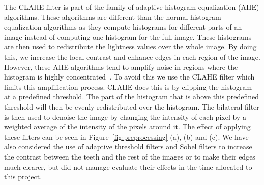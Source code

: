 \documentclass[a4paper]{article}
\begin{document}
The CLAHE filter is part of the family of adaptive histogram equalization (AHE) algorithms.
These algorithms are different than the normal histogram equalization algorithms as they compute histograms for different parts of an image instead of computing one histogram for the full image.
These histograms are then used to redistribute the lightness values over the whole image.
By doing this, we increase the local contrast and enhance edges in each region of the image.
However, these AHE algorithms tend to amplify noise in regions where the histogram is highly concentrated~\cite{AHE}. 
To avoid this we use the CLAHE filter which limits this amplification process.
CLAHE does this is by clipping the histogram at a predefined threshold.
The part of the histogram that is above this predefined threshold will then be evenly redistributed over the histogram.
The bilateral filter is then used to denoise the image by changing the intensity of each pixel by a weighted average of the intensity of the pixels around it.
The effect of applying these filters can be seen in Figure~\ref{fig:preprocessing} (a), (b) and (c).
We have also considered the use of adaptive threshold filters and Sobel filters to increase the contrast between the teeth and the rest of the images or to make their edges much clearer, but did not manage evaluate their effects in the time allocated to this project.
\end{document}
